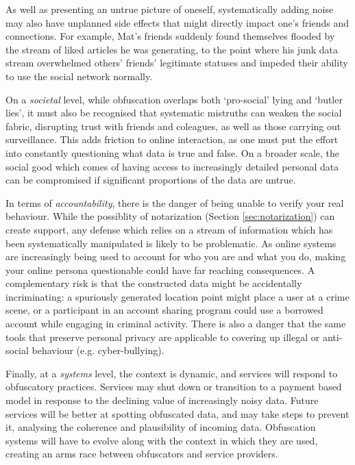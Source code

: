 \documentclass{IOS-Book-Article}     %
\begin{document}
As well as presenting an untrue picture of oneself, systematically adding noise
may also have unplanned side effects that might directly impact one's friends and connections. 
For example, Mat's friends suddenly found themselves flooded by the stream of liked articles he was 
generating, to the point where his junk data stream overwhelmed others' friends' legitimate statuses
and impeded their ability to use the social network normally. 

On a \emph{societal} level, while obfuscation overlaps both `pro-social' lying
and `butler lies', it must also be recognised that systematic mistruths can weaken the social fabric,
disrupting trust with friends and coleagues, as well as those
carrying out surveillance. This adds friction to online interaction, as one must
put the effort into constantly questioning what data is true and false.
On a broader scale, the social good which comes of having access to increasingly
detailed personal data can be compromised if significant proportions of the data
are untrue. 


In terms of \emph{accountability}, there is the danger of being unable to
verify your real behaviour. 
While the possiblity of notarization (Section \ref{sec:notarization})
can create support,
any defense which relies on a stream of information
which has been systematically manipulated is likely to be problematic. As online
systems are increasingly being used to account for who you are and what you do,
making your online persona questionable could have far reaching consequences. A
complementary risk is that the constructed data might be accidentally
incriminating: a spuriously generated location point might place a user at a
crime scene, or a participant in an account sharing program could use a
borrowed account while engaging in criminal activity.
There is also a danger that the same tools that preserve personal
privacy are applicable to covering up illegal or anti-social behaviour (e.g.
cyber-bullying). 

Finally, at a \emph{systems} level, the context is dynamic, and services will
respond to obfuscatory practices. 
Services may shut down or transition to a payment based model in response to the declining
value of increasingly noisy data.
Future services will be better at spotting 
obfuscated data, and may take steps to prevent it, analysing the coherence and
plausibility of incoming data. Obfuscation systems will have to evolve along
with the context in which they are used, creating an arms race between
obfuscators and service providers.
\end{document}
